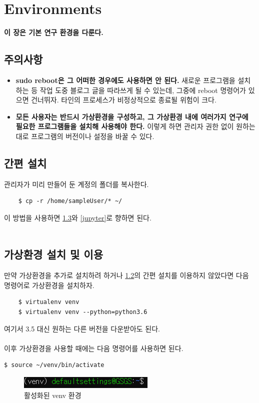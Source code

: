 
\graphicspath{{./chap4/images/}}  
\chapter{Environments}

\textbf{이 장은 기본 연구 환경을 다룬다.}
\section{주의사항}
\begin{itemize}
 \item \textbf{sudo reboot은 그 어떠한 경우에도 사용하면 안 된다.} 새로운 프로그램을 설치하는 등 작업 도중 블로그 글을 따라쓰게 될 수 있는데, 그중에 reboot 명령어가 있으면 건너뛰자. 타인의 프로세스가 비정상적으로 종료될 위험이 크다.
 \item \textbf{모든 사용자는 반드시 가상환경을 구성하고, 그 가상환경 내에 여러가지 연구에 필요한 프로그램들을 설치해 사용해야 한다.} 이렇게 하면 관리자 권한 없이 원하는 대로 프로그램의 버전이나 설정을 바꿀 수 있다.
\end{itemize}


\section{간편 설치}
\label{easy}
관리자가 미리 만들어 둔 계정의 폴더를 복사한다.
\begin{lstlisting}
    $ cp -r /home/sampleUser/* ~/
\end{lstlisting}
이 방법을 사용하면 \ref{venv}와 \ref{jupyter}로 향하면 된다.~\\\\

\section{가상환경 설치 및 이용}
\label{venv}
만약 가상환경을 추가로 설치하려 하거나 \ref{easy}의 간편 설치를 이용하지 않았다면 다음 명령어로 가상환경을 설치하자. 
\begin{lstlisting}
    $ virtualenv venv
    $ virtualenv venv --python=python3.6
\end{lstlisting}
여기서 3.5 대신 원하는 다른 버전을 다운받아도 된다. \\
~\\


이후 가상환경을 사용할 때에는 다음 명령어를 사용하면 된다.
\begin{lstlisting}[language=bash]
    $ source ~/venv/bin/activate
\end{lstlisting}
\begin{figure}[H]
	\begin{center}
        \includegraphics[width=0.6\linewidth]{venv}
        \caption{활성화된 venv 환경}
    \end{center}
    \end{figure}
